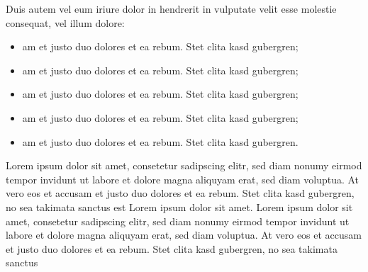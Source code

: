 \documentclass[]{../metanetpaper}
\begin{document}
\begin{Parallel}[c]{80mm}{80mm}
{    Duis autem vel eum iriure dolor in hendrerit in vulputate velit esse molestie consequat, vel illum dolore:
    \begin{itemize}
      \item am et justo duo dolores et ea rebum. Stet clita kasd gubergren;
      \item am et justo duo dolores et ea rebum. Stet clita kasd gubergren;
      \item am et justo duo dolores et ea rebum. Stet clita kasd gubergren;
      \item am et justo duo dolores et ea rebum. Stet clita kasd gubergren;
      \item am et justo duo dolores et ea rebum. Stet clita kasd gubergren.
    \end{itemize}
    Lorem ipsum dolor sit amet, consetetur sadipscing elitr, sed diam nonumy eirmod tempor invidunt ut labore et dolore magna aliquyam erat, sed diam voluptua. At vero eos et accusam et justo duo dolores et ea rebum. Stet clita kasd gubergren, no sea takimata sanctus est Lorem ipsum dolor sit amet. Lorem ipsum dolor sit amet, consetetur sadipscing elitr, sed diam nonumy eirmod tempor invidunt ut labore et dolore magna aliquyam erat, sed diam voluptua. At vero eos et accusam et justo duo dolores et ea rebum. Stet clita kasd gubergren, no sea takimata sanctus
  }

\end{Parallel}
\end{document}
